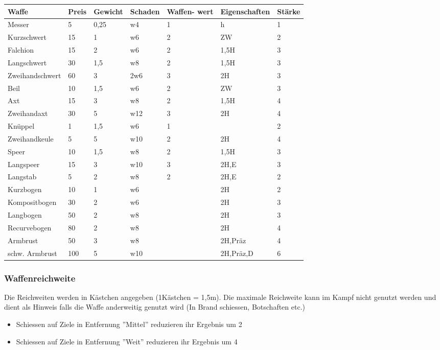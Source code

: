 \documentclass{article}
\begin{document}
\begin{small}
\begin{tabular}{|m{25mm}|m{1cm}|m{15mm}|m{15mm}|m{15mm}|m{25mm}|m{1cm}|}
\hline
\textbf{Waffe}&\textbf{Preis}&\textbf{Gewicht}&\textbf{Schaden}&\textbf{Waffen- wert}&\textbf{Eigenschaften}&\textbf{Stärke}\\
\hline
\hline
Messer&5&0,25&w4&1&h&1\\
\hline
Kurzschwert&15&1&w6&2&ZW&2\\
\hline
Falchion&15&2&w6&2&1,5H&3\\
\hline
Langschwert&30&1,5&w8&2&1,5H&3\\
\hline
Zweihandschwert&60&3&2w6&3&2H&3\\
\hline
Beil&10&1,5&w6&2&ZW&3\\
\hline
Axt&15&3&w8&2&1,5H&4\\
\hline
Zweihandaxt&30&5&w12&3&2H&4\\
\hline
Knüppel&1&1,5&w6&1&&2\\
\hline
Zweihandkeule&5&5&w10&2&2H&4\\
\hline
Speer&10&1,5&w8&2&1,5H&3\\
\hline
Langspeer&15&3&w10&3&2H,E&3\\
\hline
Langstab&5&2&w8&2&2H,E&2\\
\hline
Kurzbogen&10&1&w6&&2H&2\\
\hline
Kompositbogen&30&2&w6&&2H&3\\
\hline
Langbogen&50&2&w8&&2H&3\\
\hline
Recurvebogen&80&2&w8&&2H&4\\
\hline
Armbrust&50&3&w8&&2H,Präz&4\\
\hline
schw. Armbrust&100&5&w10&&2H,Präz,D&6\\
\hline
\end{tabular}
\end{small}

\subsubsection{Waffenreichweite}

Die Reichweiten werden in Kästchen angegeben (1Kästchen = 1,5m). Die maximale Reichweite kann im Kampf nicht genutzt
werden und dient als Hinweis falls die Waffe anderweitig genutzt wird (In Brand schiessen, Botschaften etc.)

\begin{itemize}
\item Schiessen auf Ziele in Entfernung ''Mittel'' reduzieren ihr Ergebnis um 2
\item Schiessen auf Ziele in Entfernung ''Weit'' reduzieren ihr Ergebnis um 4
\end{itemize}
\end{document}
